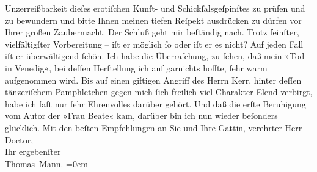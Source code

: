 \begin{ledgroupsized}[t]{13cm}
                    Unzerreißbarkeit dieſes erotiſchen Kunſt- und Schickſalsgeſpinſtes zu prüfen und
                    zu bewundern und bitte Ihnen meinen tiefen Reſpekt ausdrücken zu dürfen vor
                    Ihrer großen Zaubermacht. Der Schluß geht mir beſtändig nach. Trotz feinſter,
                    vielfältigſter Vorbereitung – iſt er möglich ſo oder iſt er es nicht? Auf jeden
                    Fall iſt er überwältigend ſchön.\pend
           \pstart
           Ich habe die Überraſchung, zu ſehen, daß mein »Tod
                        in Venedig«, bei deſſen Herſtellung ich {\pb}auf garnichts hoffte, ſehr warm
                    aufgenommen wird. Bis auf einen giftigen Angriff des Herrn Kerr, hinter deſſen tänzeriſchem Pamphletchen gegen mich ſich freilich viel
                    Charakter-Elend verbirgt, habe ich faſt nur ſehr Ehrenvolles darüber gehört. Und
                    daß die erſte Beruhigung vom Autor der »Frau
                        Beate« kam, darüber bin ich nun wieder beſonders glücklich.\pend
           \pstart
           Mit den beſten Empfehlungen an Sie und Ihre Gattin, verehrter Herr Doctor,{\\[\baselineskip]}Ihr ergebenſter{\\[\baselineskip]}\spacefill\mbox{Thomas Mann.}\pend
           \leftskip=0em{}          \endnumbering{}\end{ledgroupsized}  \newcommand{\dateiname}{L02139}\newcommand{\titel}{Thomas Mann an Arthur Schnitzler, 22. 5. 1913}\newcommand{\editorInnen}{Martin Anton Müller und Gerd-Hermann Susen}
      